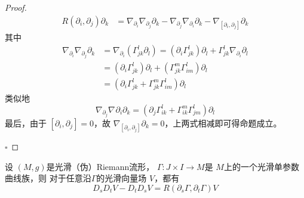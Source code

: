 \documentclass[../../几何与拓扑.tex]{subfiles}
\begin{document}
\begin{proof}
    \[
   \begin{aligned}
    R\left( \partial _{i},\partial _{j} \right)\partial _{k}& =   \nabla _{\partial _{i}} \nabla _{\partial _{j}}\partial _{k}- \nabla _{\partial _{j}} \nabla _{\partial _{i}}\partial _{k}- \nabla _{\left[ \partial _{i},\partial _{j}  \right] }\partial _{k} 
   \end{aligned} 
    \]
    其中 \[
    \begin{aligned}
     \nabla _{\partial _{i}} \nabla _{\partial _{j}} \partial _{k}& =  \nabla _{\partial _{i}}\left(  \Gamma _{jk}^{l} \partial _{l}\right)=\left(  \partial _{i} \Gamma _{jk}^{l} \right)  \partial _{l}+  \Gamma _{jk}^{l}  \nabla _{\partial _{i}}\partial _{l}\\ 
      & = \left( \partial _{i} \Gamma _{jk}^{l} \right)\partial _{l}+  \left( \Gamma _{jk}^{m} \Gamma _{im} ^{l} \right) \partial _{l}\\ 
       & =  \left( \partial _{i} \Gamma _{jk}^{l}+  \Gamma _{jk}^{m} \Gamma _{im}^{l} \right)\partial _{l} 
    \end{aligned}
    \]类似地 \[
     \nabla _{\partial _{j}} \nabla _{}\partial _{i}\partial _{k}=  \left( \partial _{j} \Gamma _{ik}^{l}+  \Gamma _{ik}^{m} \Gamma _{jm}^{l} \right)\partial _{l} 
    \]最后，由于 \(  \left[ \partial _{i},\partial _{j} \right]= 0   \)，故 \(   \nabla _{\left[ \partial _{i},\partial _{j} \right] }\partial _{k}= 0  \)，上两式相减即可得命题成立。  

    \hfill $\square$
\end{proof}
\begin{proposition}\label{pro:3.29-1}
    设 \(  \left( M,g \right)   \)是光滑（伪）Riemann流形， \(   \Gamma :J\times I\to M  \)是 \(  M  \)上的一个光滑单参数曲线族，则
       对于任意沿\(   \Gamma   \)的光滑向量场 \(  V  \)，都有 \[
       D_{s}D_{t}V-D_{t}D_{s}V= R\left( \partial _{s} \Gamma ,\partial _{t} \Gamma  \right)V 
       \]  
\end{proposition}
\end{document}
